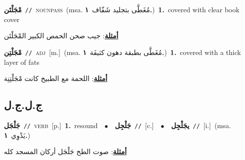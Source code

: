 \documentclass[10pt,a4paper,twoside]{article} %
\begin{document}
\begin{multicols}{2}
{\setlength\topsep{0pt}\textbf{\foreignlanguage{arabic}{مْجَلْتَن}}\ {\color{gray}\texttt{//}\color{black}}\ \textsc{noun\textunderscore pass}\ \color{gray}(msa. \foreignlanguage{arabic}{مُغَطَّى بتجليد شَفّاف}~\foreignlanguage{arabic}{\textbf{١.}})\color{black}\ \textbf{1.}~covered with clear book cover\  \begin{flushright}\color{gray}\foreignlanguage{arabic}{\textbf{\underline{\foreignlanguage{arabic}{أمثلة}}}: جيب صحن الحمص الكبير المْجَلْتَن}\end{flushright}\color{black}} \vspace{2mm}

{\setlength\topsep{0pt}\textbf{\foreignlanguage{arabic}{مْجَلْتِن}}\ {\color{gray}\texttt{//}\color{black}}\ \textsc{adj}\ [m.]\ \color{gray}(msa. \foreignlanguage{arabic}{مُغَطَّى بطبقة دهون كثيفَة}~\foreignlanguage{arabic}{\textbf{١.}})\color{black}\ \textbf{1.}~covered with a thick layer of fats\  \begin{flushright}\color{gray}\foreignlanguage{arabic}{\textbf{\underline{\foreignlanguage{arabic}{أمثلة}}}: اللحمة مع الطبيخ كانت مْجَلْتِنِة}\end{flushright}\color{black}} \vspace{2mm}

\vspace{-3mm}
\subsection*{\color{blue}\foreignlanguage{arabic}{ج.ل.ج.ل}\color{blue}{}} 

{\setlength\topsep{0pt}\textbf{\foreignlanguage{arabic}{جَلْجَل}}\ {\color{gray}\texttt{//}\color{black}}\ \textsc{verb}\ [p.]\ \textbf{1.}~resound\ \ $\bullet$\ \ \setlength\topsep{0pt}\textbf{\foreignlanguage{arabic}{جَلْجِل}}\ {\color{gray}\texttt{//}\color{black}}\ [c.]\ \ $\bullet$\ \ \setlength\topsep{0pt}\textbf{\foreignlanguage{arabic}{يجَلْجِل}}\ {\color{gray}\texttt{//}\color{black}}\ [i.]\ \color{gray}(msa. \foreignlanguage{arabic}{يَدْوِي}~\foreignlanguage{arabic}{\textbf{١.}})\color{black}\  \begin{flushright}\color{gray}\foreignlanguage{arabic}{\textbf{\underline{\foreignlanguage{arabic}{أمثلة}}}: صوت الطخ جَلْجَل أركان المسجد كله}\end{flushright}\color{black}} \vspace{2mm}


\end{multicols}
\end{document}
